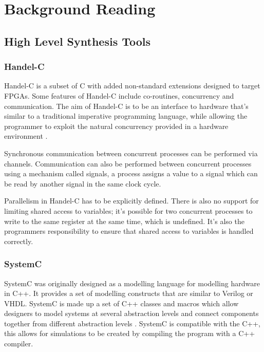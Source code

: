 \section{Background Reading}

\subsection{High Level Synthesis Tools}


\subsubsection{Handel-C}
Handel-C\cite{Handel-C} is a subset of C with added non-standard extensions designed
to target FPGAs. Some features of Handel-C include co-routines, concurrency and communication.
The aim of Handel-C is to be an interface to hardware that's similar to a traditional imperative
programming language, while allowing the programmer to exploit the natural concurrency provided in a 
hardware environment \cite{Handel-C2}. 

Synchronous communication between concurrent processes can be performed 
via channels. Communication can also be performed between concurrent processes using a mechanism called signals,
a process assigns a value to a signal which can be read by another signal in the same clock cycle.

Parallelism in Handel-C has to be explicitly defined. 
There is also no support for limiting shared access to variables; it's possible for two concurrent processes to write
to the same register at the same time, which is undefined. It's also the programmers responsibility to ensure that shared access 
to variables is handled correctly. 




\subsubsection{SystemC}
SystemC\cite{systemc} was originally designed as a modelling language for modelling hardware in
C++. It provides a set of modelling constructs that are similar to Verilog or VHDL.
SystemC is made up a set of C++ classes and macros which allow designers to model
systems at several abstraction levels and connect components together from different 
abstraction levels \cite{systemc2}. SystemC is compatible with the C++, this allows for 
simulations to be created by compiling the program with a C++ compiler.

